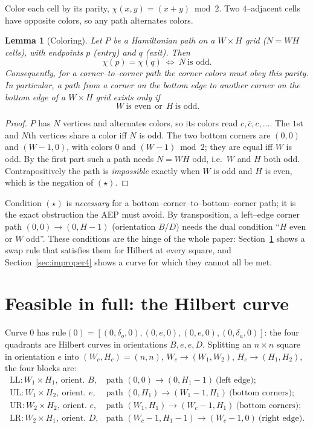 \documentclass[11pt]{article}
\newtheorem{lemma}{Lemma}
\theoremstyle{definition}
\newcommand{\LL}{\mathrm{LL}}
\newcommand{\UL}{\mathrm{UL}}
\newcommand{\UR}{\mathrm{UR}}
\newcommand{\LR}{\mathrm{LR}}
\newcommand{\col}{\chi}
\begin{document}
Color each cell by its parity, $\col(x,y)=(x+y)\bmod 2$. Two $4$--adjacent cells have
opposite colors, so any path alternates colors.

\begin{lemma}[Coloring]\label{lem:color}
Let $P$ be a Hamiltonian path on a $W\times H$ grid ($N=WH$ cells), with endpoints $p$
(entry) and $q$ (exit). Then
\[
   \col(p)=\col(q)\ \Longleftrightarrow\ N\ \text{is odd}.
\]
Consequently, for a corner--to--corner path the corner colors must obey this parity. In
particular, a path from a corner on the bottom edge to another corner on the bottom edge of
a $W\times H$ grid exists only if
\[
   \boxed{\,W\ \text{is even}\ \ \text{or}\ \ H\ \text{is odd}.}\tag{$\star$}
\]
\end{lemma}

\begin{proof}
$P$ has $N$ vertices and alternates colors, so its colors read $c,\bar c,c,\dots$. The
$1$st and $N$th vertices share a color iff $N$ is odd. The two bottom corners are $(0,0)$
and $(W-1,0)$, with colors $0$ and $(W-1)\bmod 2$; they are equal iff $W$ is odd. By the
first part such a path needs $N=WH$ odd, i.e.\ $W$ and $H$ both odd. Contrapositively the
path is \emph{impossible} exactly when $W$ is odd and $H$ is even, which is the negation of
$(\star)$.
\end{proof}

Condition $(\star)$ is \emph{necessary} for a bottom--corner--to--bottom--corner path; it
is the exact obstruction the AEP must avoid. By transposition, a left--edge corner path
$(0,0)\!\to\!(0,H-1)$ (orientation $B$/$D$) needs the dual condition ``$H$ even or $W$
odd''. These conditions are the hinge of the whole paper: Section~\ref{sec:hilbert} shows a
swap rule that satisfies them for Hilbert at every square, and Section~\ref{sec:improper4}
shows a curve for which they cannot all be met.

\section{Feasible in full: the Hilbert curve}\label{sec:hilbert}

Curve $0$ has $\mathrm{rule}(0)=[(0,\delta_o,0),(0,e,0),(0,e,0),(0,\delta_a,0)]$: the four
quadrants are Hilbert curves in orientations $B,e,e,D$. Splitting an $n\times n$ square in
orientation $e$ into $(W_c,H_c)=(n,n)$, $W_c\!\to\!(W_1,W_2)$, $H_c\!\to\!(H_1,H_2)$, the
four blocks are:
\[
\begin{array}{llll}
\LL: W_1\times H_1,\ \text{orient. }B, & \text{path }(0,0)\!\to\!(0,H_1\!-\!1)\ \text{(left edge)};\\
\UL: W_1\times H_2,\ \text{orient. }e, & \text{path }(0,H_1)\!\to\!(W_1\!-\!1,H_1)\ \text{(bottom corners)};\\
\UR: W_2\times H_2,\ \text{orient. }e, & \text{path }(W_1,H_1)\!\to\!(W_c\!-\!1,H_1)\ \text{(bottom corners)};\\
\LR: W_2\times H_1,\ \text{orient. }D, & \text{path }(W_c\!-\!1,H_1\!-\!1)\!\to\!(W_c\!-\!1,0)\ \text{(right edge)}.
\end{array}
\]
\end{document}
